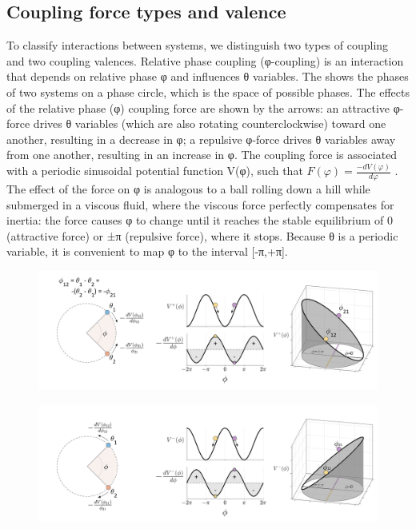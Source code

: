 \subsection{Coupling force types and valence} 

To classify interactions between systems, we distinguish two types of coupling and two coupling valences. Relative phase coupling (φ-coupling) is an interaction that depends on relative phase φ and influences θ variables. The {\figurebelow} shows the phases of two systems on a phase circle, which is the space of possible phases. The effects of the relative phase (φ) coupling force are shown by the arrows: an attractive φ-force drives θ variables (which are also rotating counterclockwise) toward one another, resulting in a decrease in φ; a repulsive φ-force drives θ variables away from one another, resulting in an increase in φ. The coupling force is associated with a periodic sinusoidal potential function V(φ), such that  $F\left(\varphi \right)=\frac{-{dV}\left(\varphi \right)}{{d\varphi} }$ . The effect of the force on φ is analogous to a ball rolling down a hill while submerged in a viscous fluid, where the viscous force perfectly compensates for inertia: the force causes φ to change until it reaches the stable equilibrium of 0 (attractive force) or ±π (repulsive force), where it stops. Because θ is a periodic variable, it is convenient to map φ to the interval [-π,+π]. 

  
\begin{figure}
\includegraphics[width=\textwidth]{figures/Tilsen-img18.png}
\caption{\missingcaption}
\label{fig:2:11}
\end{figure}
 

  
\begin{figure}
\includegraphics[width=\textwidth]{figures/Tilsen-img19.png}
\caption{\missingcaption}
\label{fig:2:12}
\end{figure}
 

